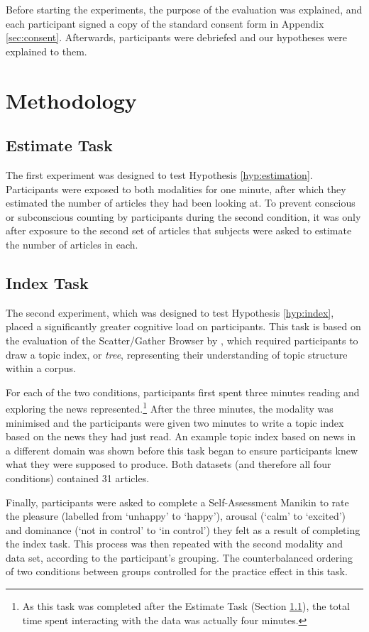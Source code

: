 Before starting the experiments, the purpose of the evaluation was explained, and each participant signed a copy of the standard consent form in Appendix \ref{sec:consent}. Afterwards, participants were debriefed and our hypotheses were explained to them.

\section{Methodology}

\subsection{Estimate Task} \label{task:est}

The first experiment was designed to test Hypothesis \ref{hyp:estimation}. Participants were exposed to both modalities for one minute, after which they estimated the number of articles they had been looking at. To prevent conscious or subconscious counting by participants during the second condition, it was only after exposure to the second set of articles that subjects were asked to estimate the number of articles in each.

\subsection{Index Task}

The second experiment, which was designed to test Hypothesis \ref{hyp:index}, placed a significantly greater cognitive load on  participants. This task is based on the evaluation of the Scatter/Gather Browser by \cite{scattergather}, which required participants to draw a topic index, or \textit{tree}, representing their understanding of topic structure within a corpus.

For each of the two conditions, participants first spent three minutes reading and exploring the news represented.\footnote{As this task was completed after the Estimate Task (Section \ref{task:est}), the total time spent interacting with the data was actually four minutes.} After the three minutes, the modality was minimised and the participants were given two minutes to write a topic index based on the news they had just read. An example topic index based on news in a different domain was shown before this task began to ensure participants knew what they were supposed to produce. Both datasets (and therefore all four conditions) contained 31 articles.

Finally, participants were asked to complete a Self-Assessment Manikin \citep{measuringemotion} to rate the pleasure (labelled from `unhappy' to `happy'), arousal (`calm' to `excited') and dominance (`not in control' to `in control') they felt as a result of completing the index task. This process was then repeated with the second modality and data set, according to the participant's grouping. The counterbalanced ordering of two conditions between groups controlled for the practice effect in this task.

